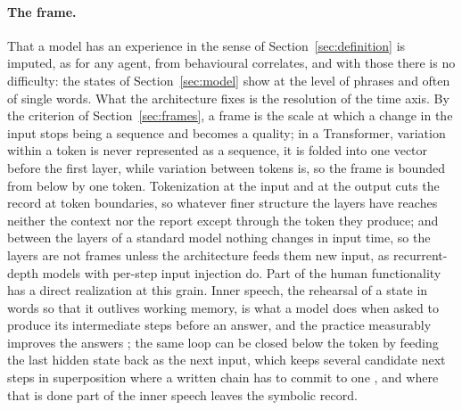 \paragraph{The frame.}
That a model has an experience in the sense of Section~\ref{sec:definition} is imputed, as for any
agent, from behavioural correlates, and with those there is no difficulty: the states of
Section~\ref{sec:model} show at the level of phrases and often of single words. What the architecture
fixes is the resolution of the time axis. By the criterion of Section~\ref{sec:frames}, a frame is the
scale at which a change in the input stops being a sequence and becomes a quality; in a Transformer,
variation within a token is never represented as a sequence, it is folded into one vector before the
first layer, while variation between tokens is, so the frame is bounded from below by one token.
Tokenization at the input and at the output cuts the record at token boundaries, so whatever finer
structure the layers have reaches neither the context nor the report except through the token they
produce; and between the layers of a standard model nothing changes in input time, so the layers are
not frames unless the architecture feeds them new input, as recurrent-depth models with per-step
input injection do. Part of the human functionality has a direct realization at this grain. Inner
speech, the rehearsal of a state in words so that it outlives working memory, is what a model does
when asked to produce its intermediate steps before an answer, and the practice measurably improves
the answers \citep{wei2022}; the same loop can be closed below the token by feeding the last hidden
state back as the next input, which keeps several candidate next steps in superposition where a
written chain has to commit to one \citep{hao2024}, and where that is done part of the inner speech
leaves the symbolic record.

